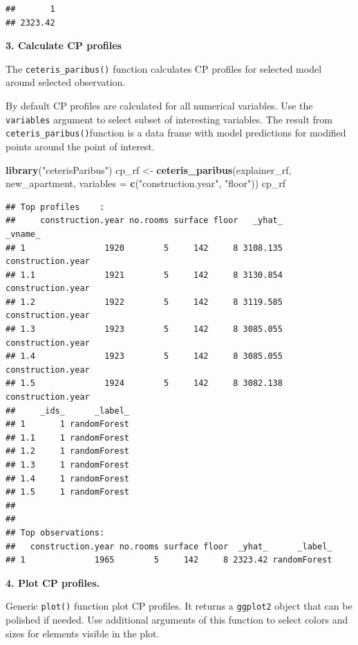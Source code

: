 \documentclass[]{krantz}
\newenvironment{Shaded}{\begin{snugshade}}{\end{snugshade}}
\newcommand{\DataTypeTok}[1]{\textcolor[rgb]{0.13,0.29,0.53}{#1}}
\newcommand{\KeywordTok}[1]{\textcolor[rgb]{0.13,0.29,0.53}{\textbf{#1}}}
\newcommand{\NormalTok}[1]{#1}
\newcommand{\StringTok}[1]{\textcolor[rgb]{0.31,0.60,0.02}{#1}}
\theoremstyle{definition}
\theoremstyle{definition}
\theoremstyle{definition}
\theoremstyle{remark}
\begin{document}
\begin{verbatim}
##       1 
## 2323.42
\end{verbatim}

\textbf{3. Calculate CP profiles}

The \texttt{ceteris\_paribus()} function calculates CP profiles for
selected model around selected observation.

By default CP profiles are calculated for all numerical variables. Use
the \texttt{variables} argument to select subset of interesting
variables. The result from \texttt{ceteris\_paribus()}function is a data
frame with model predictions for modified points around the point of
interest.

\begin{Shaded}
\begin{Highlighting}[]
\KeywordTok{library}\NormalTok{(}\StringTok{"ceterisParibus"}\NormalTok{)}
\NormalTok{cp_rf <-}\StringTok{ }\KeywordTok{ceteris_paribus}\NormalTok{(explainer_rf, new_apartment, }
                            \DataTypeTok{variables =} \KeywordTok{c}\NormalTok{(}\StringTok{"construction.year"}\NormalTok{, }\StringTok{"floor"}\NormalTok{))}
\NormalTok{cp_rf}
\end{Highlighting}
\end{Shaded}

\begin{verbatim}
## Top profiles    : 
##     construction.year no.rooms surface floor   _yhat_           _vname_
## 1                1920        5     142     8 3108.135 construction.year
## 1.1              1921        5     142     8 3130.854 construction.year
## 1.2              1922        5     142     8 3119.585 construction.year
## 1.3              1923        5     142     8 3085.055 construction.year
## 1.4              1923        5     142     8 3085.055 construction.year
## 1.5              1924        5     142     8 3082.138 construction.year
##     _ids_      _label_
## 1       1 randomForest
## 1.1     1 randomForest
## 1.2     1 randomForest
## 1.3     1 randomForest
## 1.4     1 randomForest
## 1.5     1 randomForest
## 
## 
## Top observations:
##   construction.year no.rooms surface floor  _yhat_      _label_
## 1              1965        5     142     8 2323.42 randomForest
\end{verbatim}

\textbf{4. Plot CP profiles.}

Generic \texttt{plot()} function plot CP profiles. It returns a
\texttt{ggplot2} object that can be polished if needed. Use additional
arguments of this function to select colors and sizes for elements
visible in the plot.
\end{document}
